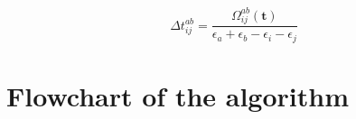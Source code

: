 \begin{equation}
  \Delta t_{ij}^{ab} = \frac{\Omega_{ij}^{ab}(\mathbf{t})}
  {\epsilon_a + \epsilon_b - \epsilon_i - \epsilon_j}
\end{equation}



\newpage
\section{Flowchart of the algorithm}
\label{sec:ccsd_flowchart}





